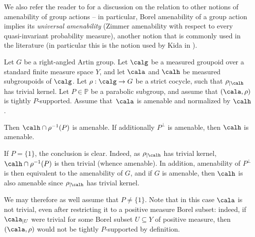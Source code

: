 We also refer the reader to \cite[\S 2]{GHL} for a discussion on the relation to other notions of amenability of group actions -- in particular, Borel amenability of a group action implies its \emph{universal amenability} (\ie Zimmer amenability with respect to every quasi-invariant probability measure), another notion that is commonly used in the literature (in particular this is the notion used by Kida in \cite{Kid-memoir}).


\begin{lemma}\label{lemma:amenable-normal}
Let $G$ be a right-angled Artin group. Let $\calg$ be a measured groupoid over a standard finite measure space $Y$, and let $\cala$ and $\calh$ be measured subgroupoids of $\calg$. Let $\rho:\calg\to G$ be a strict cocycle, such that $\rho_{|\calh}$ has trivial kernel. Let $P\in\mathbb{P}$ be a parabolic subgroup, and assume that $(\cala,\rho)$ is tightly $P$-supported. Assume that~$\cala$ is amenable and normalized by $\calh$.

Then $\calh\cap\rho^{-1}(P)$ is amenable. If additionally $P^{\perp}$ is amenable, then $\calh$ is amenable.
\end{lemma}

\begin{rk}
If $P=\{1\}$, the conclusion is clear. Indeed, as $\rho_{|\calh}$ has trivial kernel, $\calh\cap\rho^{-1}(P)$ is then trivial (whence amenable). In addition, amenability of $P^{\perp}$ is then equivalent to the amenability of $G$, and if $G$ is amenable, then $\calh$ is also amenable since $\rho_{|\calh}$ has trivial kernel.

We may therefore as well assume that $P\neq\{1\}$. Note that in this case $\cala$ is not trivial, even after restricting it to a positive measure Borel subset: indeed, if $\cala_{|U}$ were trivial for some Borel subset $U\subseteq Y$ of positive measure, then $(\cala,\rho)$ would not be tightly $P$-supported by definition.
\end{rk}

